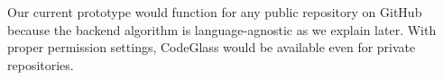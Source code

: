 Our current prototype would function for any public repository on GitHub because the backend algorithm is language-agnostic as we explain later.
With proper permission settings, CodeGlass would be available even for private repositories.

